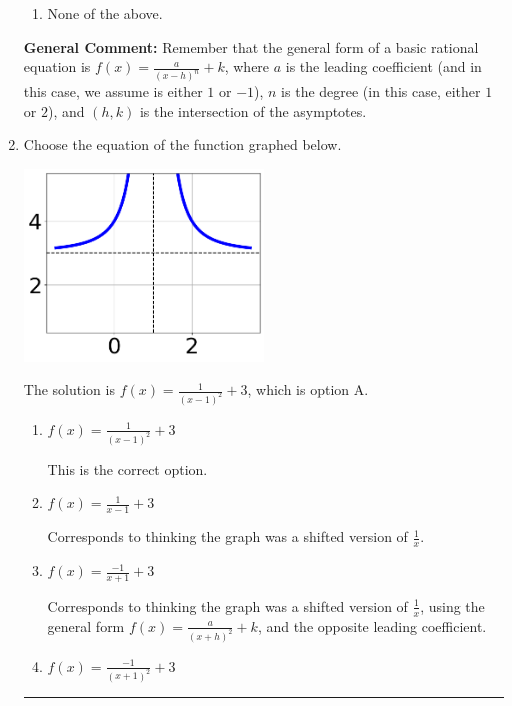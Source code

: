 \documentclass{extbook}[14pt]
\newcommand{\litem}[1]{\item #1

\rule{\textwidth}{0.4pt}}
\begin{document}
\begin{enumerate}
{\begin{enumerate}[label=\Alph*.]
\item None of the above.\end{enumerate}
\textbf{General Comment:} Remember that the general form of a basic rational equation is $ f(x) = \frac{a}{(x-h)^n} + k$, where $a$ is the leading coefficient (and in this case, we assume is either $1$ or $-1$), $n$ is the degree (in this case, either $1$ or $2$), and $(h, k)$ is the intersection of the asymptotes.
}
\litem{
Choose the equation of the function graphed below.

\begin{center}
    \includegraphics[width=0.5\textwidth]{../Figures/rationalGraphToEquationCopyB.png}
\end{center}


The solution is \( f(x) = \frac{1}{(x - 1)^2} + 3 \), which is option A.\begin{enumerate}[label=\Alph*.]
\item \( f(x) = \frac{1}{(x - 1)^2} + 3 \)

This is the correct option.
\item \( f(x) = \frac{1}{x - 1} + 3 \)

Corresponds to thinking the graph was a shifted version of $\frac{1}{x}$.
\item \( f(x) = \frac{-1}{x + 1} + 3 \)

Corresponds to thinking the graph was a shifted version of $\frac{1}{x}$, using the general form $f(x) = \frac{a}{(x+h)^2}+k$, and the opposite leading coefficient.
\item \( f(x) = \frac{-1}{(x + 1)^2} + 3 \)


\end{enumerate}}
\end{enumerate}
\end{document}
